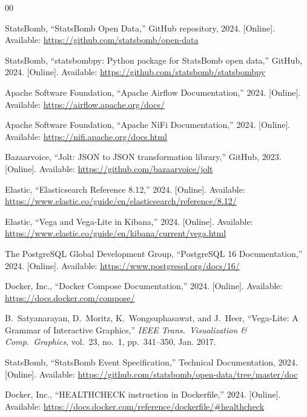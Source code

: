 \documentclass[conference]{IEEEtran}
\begin{document}
\begin{thebibliography}{00}

StatsBomb, ``StatsBomb Open Data,'' GitHub repository, 2024.
[Online]. Available: \url{https://github.com/statsbomb/open-data}

StatsBomb, ``statsbombpy: Python package for StatsBomb open data,'' GitHub, 2024.
[Online]. Available: \url{https://github.com/statsbomb/statsbombpy}

Apache Software Foundation, ``Apache Airflow Documentation,'' 2024.
[Online]. Available: \url{https://airflow.apache.org/docs/}

Apache Software Foundation, ``Apache NiFi Documentation,'' 2024.
[Online]. Available: \url{https://nifi.apache.org/docs.html}

Bazaarvoice, ``Jolt: JSON to JSON transformation library,'' GitHub, 2023.
[Online]. Available: \url{https://github.com/bazaarvoice/jolt}

Elastic, ``Elasticsearch Reference 8.12,'' 2024.
[Online]. Available: \url{https://www.elastic.co/guide/en/elasticsearch/reference/8.12/}

Elastic, ``Vega and Vega-Lite in Kibana,'' 2024.
[Online]. Available: \url{https://www.elastic.co/guide/en/kibana/current/vega.html}

The PostgreSQL Global Development Group, ``PostgreSQL 16 Documentation,'' 2024.
[Online]. Available: \url{https://www.postgresql.org/docs/16/}

Docker, Inc., ``Docker Compose Documentation,'' 2024.
[Online]. Available: \url{https://docs.docker.com/compose/}

B.~Satyanarayan, D.~Moritz, K.~Wongsuphasawat, and J.~Heer,
``Vega-Lite: A Grammar of Interactive Graphics,''
\textit{IEEE Trans.\ Visualization \& Comp.\ Graphics}, vol.~23, no.~1,
pp.~341--350, Jan. 2017.

StatsBomb, ``StatsBomb Event Specification,'' Technical Documentation, 2024.
[Online]. Available: \url{https://github.com/statsbomb/open-data/tree/master/doc}

Docker, Inc., ``HEALTHCHECK instruction in Dockerfile,'' 2024.
[Online]. Available: \url{https://docs.docker.com/reference/dockerfile/#healthcheck}

\end{thebibliography}
\end{document}

